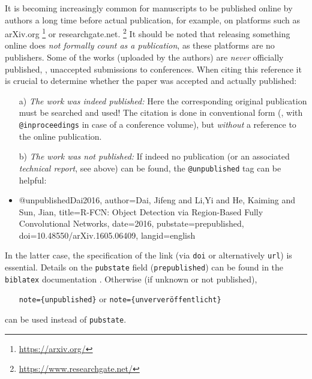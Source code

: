 It is becoming increasingly common for manuscripts to be published online by
authors a long time before actual publication, for example, on platforms such as
\textsf{arXiv.org}%
\footnote{\url{https://arxiv.org/}}
or \textsf{researchgate.net}.%
\footnote{\url{https://www.researchgate.net/}}
It should be noted that releasing something online does \emph{not formally
count as a publication}, as these platforms are no publishers. Some of the
works (uploaded by the authors) are \emph{never} officially published, \eg,
unaccepted submissions to conferences. When citing this reference it is crucial
to determine whether the paper was accepted and actually published:
%
\begin{itemize}
\item[a)]
\emph{The work was indeed published:} Here the corresponding original
publication must be searched and used! The citation is done in conventional form
(\eg, with \texttt{@inproceedings} in case of a conference volume), but
\emph{without} a reference to the online publication.
\item[b)]
\emph{The work was \emph{not} published:} If indeed no publication (or an
associated \emph{technical report}, see above) can be found, the
\texttt{@unpublished} tag can be helpful:
\item %
\begin{GenericCode}[numbers=none]
@unpublished{Dai2016,
  author={Dai, Jifeng and Li,Yi and He, Kaiming and Sun, Jian},
  title={{R-FCN:} Object Detection via Region-Based Fully Convolutional Networks},
  date={2016},
  pubstate={prepublished},
  doi={10.48550/arXiv.1605.06409},
  langid={english}
}
\end{GenericCode}
\begin{itemize}
\item[\cite{Dai2016}] 
\end{itemize}
%
\end{itemize}
%
In the latter case, the specification of the link (via \texttt{doi} or alternatively
\texttt{url}) is essential. Details on the \texttt{pubstate} field
(\texttt{prepublished}) can be found in the \texttt{biblatex} documentation
\cite[Sec.\ 4.9.2.11]{Kime2022}. Otherwise (if unknown or not published),
%
\begin{itemize}
\item[]\texttt{note=\{unpublished\}} \quad or
   \quad \texttt{note=\{unververöffentlicht\}}
\end{itemize}
%
can be used instead of \texttt{pubstate}.


